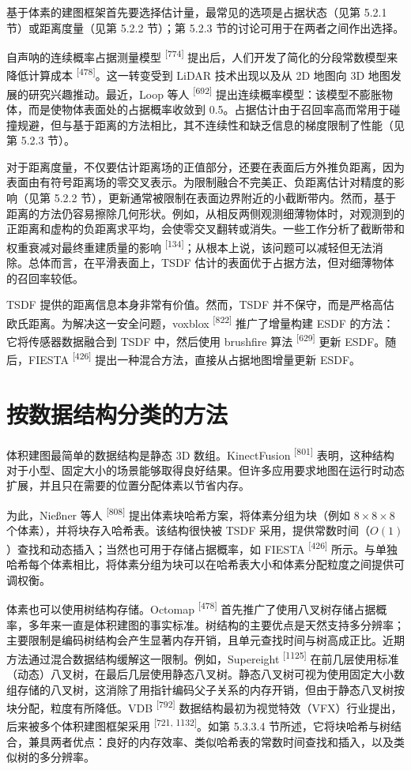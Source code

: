 基于体素的建图框架首先要选择估计量，最常见的选项是占据状态（见第 5.2.1 节）或距离度量（见第 5.2.2 节）；第 5.2.3 节的讨论可用于在两者之间作出选择。

自声呐的连续概率占据测量模型 \textsuperscript{[774]} 提出后，人们开发了简化的分段常数模型来降低计算成本 \textsuperscript{[478]}。这一转变受到 LiDAR 技术出现以及从 2D 地图向 3D 地图发展的研究兴趣推动。最近，Loop 等人 \textsuperscript{[692]} 提出连续概率模型：该模型不膨胀物体，而是使物体表面处的占据概率收敛到 0.5。占据估计由于召回率高而常用于碰撞规避，但与基于距离的方法相比，其不连续性和缺乏信息的梯度限制了性能（见第 5.2.3 节）。

对于距离度量，不仅要估计距离场的正值部分，还要在表面后方外推负距离，因为表面由有符号距离场的零交叉表示。为限制融合不完美正、负距离估计对精度的影响（见第 5.2.2 节），更新通常被限制在表面边界附近的小截断带内。然而，基于距离的方法仍容易擦除几何形状。例如，从相反两侧观测细薄物体时，对观测到的正距离和虚构的负距离求平均，会使零交叉翻转或消失。一些工作分析了截断带和权重衰减对最终重建质量的影响 \textsuperscript{[134]}；从根本上说，该问题可以减轻但无法消除。总体而言，在平滑表面上，TSDF 估计的表面优于占据方法，但对细薄物体的召回率较低。

TSDF 提供的距离信息本身非常有价值。然而，TSDF 并不保守，而是严格高估欧氏距离。为解决这一安全问题，voxblox \textsuperscript{[822]} 推广了增量构建 ESDF 的方法：它将传感器数据融合到 TSDF 中，然后使用 brushfire 算法 \textsuperscript{[629]} 更新 ESDF。随后，FIESTA \textsuperscript{[426]} 提出一种混合方法，直接从占据地图增量更新 ESDF。

\section{按数据结构分类的方法}

体积建图最简单的数据结构是静态 3D 数组。KinectFusion \textsuperscript{[801]} 表明，这种结构对于小型、固定大小的场景能够取得良好结果。但许多应用要求地图在运行时动态扩展，并且只在需要的位置分配体素以节省内存。

为此，Nießner 等人 \textsuperscript{[808]} 提出体素块哈希方案，将体素分组为块（例如 $8\times8\times8$ 个体素），并将块存入哈希表。该结构很快被 TSDF 采用，提供常数时间（$O(1)$）查找和动态插入；当然也可用于存储占据概率，如 FIESTA \textsuperscript{[426]} 所示。与单独哈希每个体素相比，将体素分组为块可以在哈希表大小和体素分配粒度之间提供可调权衡。

体素也可以使用树结构存储。Octomap \textsuperscript{[478]} 首先推广了使用八叉树存储占据概率，多年来一直是体积建图的事实标准。树结构的主要优点是天然支持多分辨率；主要限制是编码树结构会产生显著内存开销，且单元查找时间与树高成正比。近期方法通过混合数据结构缓解这一限制。例如，Supereight \textsuperscript{[1125]} 在前几层使用标准（动态）八叉树，在最后几层使用静态八叉树。静态八叉树可视为使用固定大小数组存储的八叉树，这消除了用指针编码父子关系的内存开销，但由于静态八叉树按块分配，粒度有所降低。VDB \textsuperscript{[792]} 数据结构最初为视觉特效（VFX）行业提出，后来被多个体积建图框架采用 \textsuperscript{[721, 1132]}。如第 5.3.3.4 节所述，它将块哈希与树结合，兼具两者优点：良好的内存效率、类似哈希表的常数时间查找和插入，以及类似树的多分辨率。

